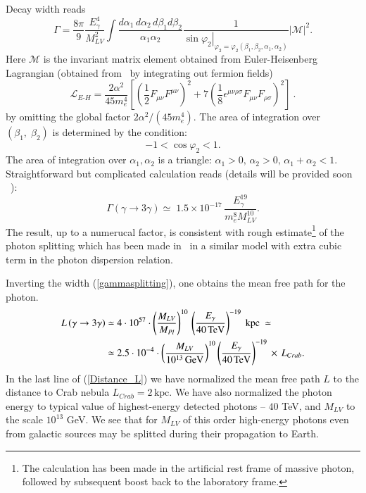 \documentclass{webofc}
\def\l{\left(}
\def\r{\right)}
\newcommand{\be}{\begin{equation}}
\newcommand{\ee}{\end{equation}}
\begin{document}
Decay width reads
\begin{equation}
\label{PhaseVolume_4}
\Gamma = \frac{8\pi}{9}\frac{E_{\gamma}^4}{M_{LV}^2} \int \frac{d\alpha_1\, d\alpha_2\, d\beta_1 d\beta_2}{\alpha_1\alpha_2} \frac{1}{\left. \sin\varphi_2 \right|_{\varphi_2=\varphi_2(\beta_1,\beta_2,\alpha_1,\alpha_2)}} |\mathcal{M}|^2.
\end{equation}
Here $\mathcal{M}$ is the invariant matrix element 
obtained from Euler-Heisenberg Lagrangian (obtained from~\label{L1} by integrating out fermion fields)
\begin{equation}
\mathcal{L}_{E\mbox{-}H}=\frac{2 \alpha^2}{45 m_e^4}
\left[\left(\frac 12 F_{\mu\nu}F^{\mu\nu}\right)^2 
+7 \left(\frac 18 \epsilon^{\mu\nu\rho\sigma} 
F_{\mu\nu}F_{\rho\sigma}\right)^2\right]~.
\label{euler}
\end{equation}
by omitting the global factor 
${2 \alpha^2}/({45 m_e^4})$.
The area of integration over $(\beta_1,\; \beta_2)$ is determined by the condition: 
$$
-1<\cos\varphi_2 <1.
$$
The area of integration over $\alpha_1,\alpha_2$ is a triangle: $\alpha_1>0,\,\alpha_2>0,\, \alpha_1+\alpha_2<1$. 
Straightforward but complicated calculation reads (details will be provided soon ~\cite{ASK:2018}):
\be\label{gammasplitting}
\Gamma \l\gamma \to 3\gamma\r \simeq\; 1.5 \times 10^{-17}\,\frac{E_\gamma^{19}}{m_e^8 M_{LV}^{10}}.
\ee 
The result, up to a numerucal factor, is consistent with rough estimate\footnote{The calculation has been made in the artificial rest frame of massive photon, followed by subsequent boost back to the laboratory frame.} of the photon splitting which has been made in~\cite{Gelmini:2005gy} in a similar model with extra cubic term in the photon dispersion relation.  

Inverting the width (\ref{gammasplitting}), one obtains the mean free path for the photon.
\begin{align} \label{Distance_L}
L  \l\gamma \to 3\gamma\r & \simeq 4 \cdot 10^{57} \cdot \left(\frac{M_{LV}}{M_{Pl}}\right)^{10}\, \l \frac{E_\gamma}{40\, \mbox{TeV}}\r^{-19}\  \mbox{kpc}\ \simeq  \notag \\
& \simeq 2.5 \cdot 10^{-4}\cdot \left(\frac{M_{LV}}{10^{13}\,\mbox{GeV}}\right)^{10}\l \frac{E_\gamma}{40\, \mbox{TeV}}\r^{-19}\,\times \, L_{Crab}.
\end{align}
In the last line of (\ref{Distance_L}) we have normalized the mean free path $L$ to the distance to Crab nebula $L_{Crab} = 2\, \mbox{kpc}$. We have also normalized the photon energy to typical value of highest-energy detected photons -- $40$ TeV, and $M_{LV}$ to the scale $10^{13}$ GeV. We see that for $M_{LV}$ of this order high-energy photons even from galactic sources may be splitted during their propagation to Earth.  
\end{document}

